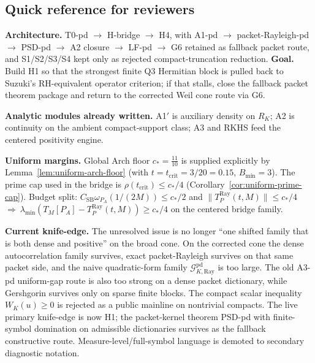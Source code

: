 \subsection*{Quick reference for reviewers}\label{sec:quick-ref}
\begin{tcolorbox}[colback=white,colframe=black!60]
\textbf{Architecture.} \textup{T0-pd} $\to$ \textup{H-bridge} $\to$ \textup{H4}, with \textup{A1-pd} $\to$ \textup{packet-Rayleigh-pd} $\to$ \textup{PSD-pd} $\to$ \textup{A2 closure} $\to$ \textup{LF-pd} $\to$ \textup{G6} retained as fallback packet route, and \textup{S1/S2/S3/S4} kept only as rejected compact-truncation reduction.
\textbf{Goal.} Build \textup{H1} so that the strongest finite Q3 Hermitian block is pulled back to Suzuki's RH-equivalent operator criterion; if that stalls, close the fallback packet theorem package and return to the corrected Weil cone route via G6.

\textbf{Analytic modules already written.} A1$'$ is auxiliary density on $R_K$; A2 is continuity on the ambient compact-support class; A3 and RKHS feed the centered positivity engine.

\textbf{Uniform margins.} Global Arch floor $c_\ast=\tfrac{11}{10}$ is supplied explicitly by
Lemma~\ref{lem:uniform-arch-floor} (with $t=t_{\mathrm{crit}}=3/20=0.15$, $B_{\min}=3$). The prime cap used in the bridge is
$\rho(t_{\mathrm{crit}})\le c_\ast/4$ (Corollary~\ref{cor:uniform-prime-cap}).
Budget split: $C_{\mathrm{SB}}\omega_{P_A}(1/(2M))\le c_\ast/2$ and $\|T_P^{\mathrm{Ray}}(t,M)\|\le c_\ast/4$
\ $\Rightarrow\ \lambda_{\min}(T_M[P_A]-T_P^{\mathrm{Ray}}(t,M))\ge c_\ast/4$ on the centered bridge family.

\textbf{Current knife-edge.} The unresolved issue is no longer “one shifted family that is both dense and positive” on the broad cone. On the corrected cone the dense autocorrelation family survives, exact packet-Rayleigh survives on that same packet side, and the naive quadratic-form family $\mathcal G_{K,\mathrm{Ray}}^{\mathrm{pd}}$ is too large. The old A3-pd uniform-gap route is also too strong on a dense packet dictionary, while Gershgorin survives only on sparse finite blocks. The compact scalar inequality $W_K(u)\ge0$ is rejected as a public mainline on nontrivial compacts. The live primary knife-edge is now \textup{H1}; the packet-kernel theorem \textup{PSD-pd} with finite-symbol domination on admissible dictionaries survives as the fallback constructive route. Measure-level/full-symbol language is demoted to secondary diagnostic notation.
\end{tcolorbox}

